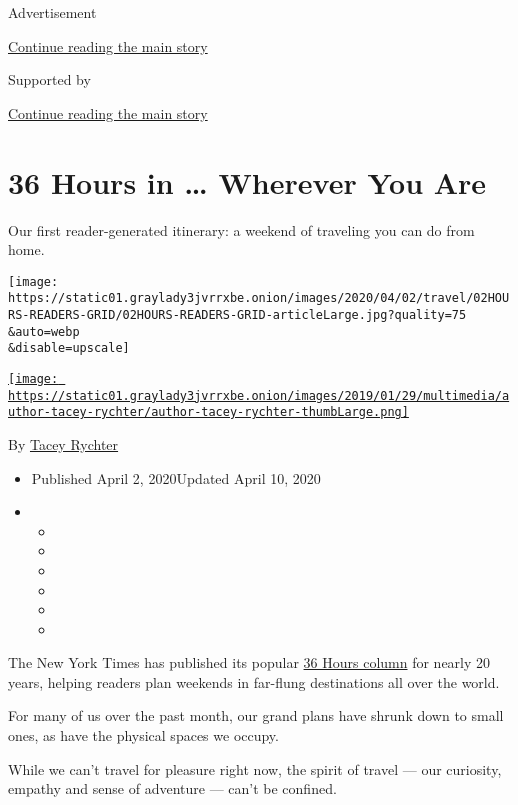 Advertisement

\protect\hyperlink{after-top}{Continue reading the main story}

Supported by

\protect\hyperlink{after-sponsor}{Continue reading the main story}

\hypertarget{36-hours-in--wherever-you-are}{%
\section{36 Hours in \ldots{} Wherever You
Are}\label{36-hours-in--wherever-you-are}}

Our first reader-generated itinerary: a weekend of traveling you can do
from home.

\texttt{[image: https://static01.graylady3jvrrxbe.onion/images/2020/04/02/travel/02HOURS-READERS-GRID/02HOURS-READERS-GRID-articleLarge.jpg?quality=75\\\&auto=webp\\\&disable=upscale]}

\href{https://www.nytimes3xbfgragh.onion/by/tacey-rychter}{\texttt{[image: https://static01.graylady3jvrrxbe.onion/images/2019/01/29/multimedia/author-tacey-rychter/author-tacey-rychter-thumbLarge.png]}}

By \href{https://www.nytimes3xbfgragh.onion/by/tacey-rychter}{Tacey
Rychter}

\begin{itemize}
\item
  Published April 2, 2020Updated April 10, 2020
\item
  \begin{itemize}
  \item
  \item
  \item
  \item
  \item
  \item
  \end{itemize}
\end{itemize}

The New York Times has published its popular
\href{https://www.nytimes3xbfgragh.onion/column/36-hours}{36 Hours
column} for nearly 20 years, helping readers plan weekends in far-flung
destinations all over the world.

For many of us over the past month, our grand plans have shrunk down to
small ones, as have the physical spaces we occupy.

While we can't travel for pleasure right now, the spirit of travel ---
our curiosity, empathy and sense of adventure --- can't be confined.

